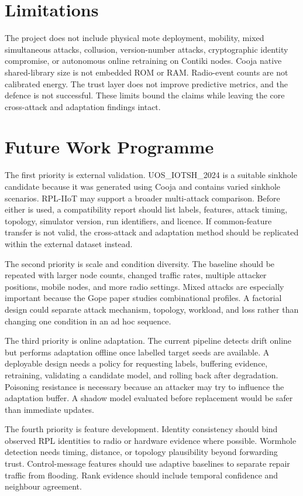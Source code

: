 \section{Limitations}

The project does not include physical mote deployment, mobility, mixed simultaneous attacks, collusion, version-number attacks, cryptographic identity compromise, or autonomous online retraining on Contiki nodes. Cooja native shared-library size is not embedded ROM or RAM. Radio-event counts are not calibrated energy. The trust layer does not improve predictive metrics, and the defence is not successful. These limits bound the claims while leaving the core cross-attack and adaptation findings intact.

\section{Future Work Programme}

The first priority is external validation. UOS\_IOTSH\_2024 is a suitable sinkhole candidate because it was generated using Cooja and contains varied sinkhole scenarios. RPL-IIoT may support a broader multi-attack comparison. Before either is used, a compatibility report should list labels, features, attack timing, topology, simulator version, run identifiers, and licence. If common-feature transfer is not valid, the cross-attack and adaptation method should be replicated within the external dataset instead.

The second priority is scale and condition diversity. The baseline should be repeated with larger node counts, changed traffic rates, multiple attacker positions, mobile nodes, and more radio settings. Mixed attacks are especially important because the Gope paper studies combinational profiles. A factorial design could separate attack mechanism, topology, workload, and loss rather than changing one condition in an ad hoc sequence.

The third priority is online adaptation. The current pipeline detects drift online but performs adaptation offline once labelled target seeds are available. A deployable design needs a policy for requesting labels, buffering evidence, retraining, validating a candidate model, and rolling back after degradation. Poisoning resistance is necessary because an attacker may try to influence the adaptation buffer. A shadow model evaluated before replacement would be safer than immediate updates.

The fourth priority is feature development. Identity consistency should bind observed RPL identities to radio or hardware evidence where possible. Wormhole detection needs timing, distance, or topology plausibility beyond forwarding trust. Control-message features should use adaptive baselines to separate repair traffic from flooding. Rank evidence should include temporal confidence and neighbour agreement.

